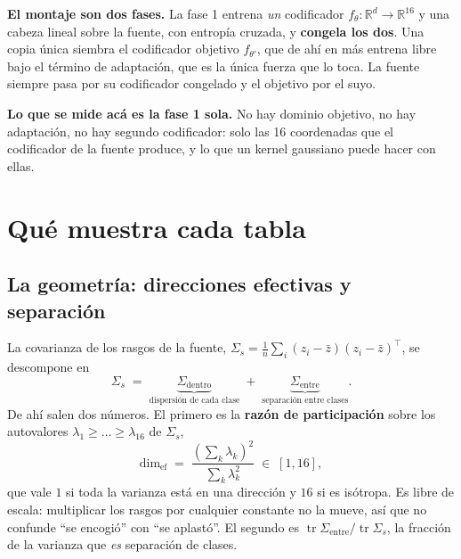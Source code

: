 \documentclass[11pt,a4paper]{article}
\begin{document}
\textbf{El montaje son dos fases.} La fase 1 entrena \emph{un} codificador
$f_\theta: \mathbb{R}^d \to \mathbb{R}^{16}$ y una cabeza lineal sobre la fuente,
con entropía cruzada, y \textbf{congela los dos}. Una copia única siembra el
codificador objetivo $f_{\theta'}$, que de ahí en más entrena libre bajo el término
de adaptación, que es la única fuerza que lo toca. La fuente siempre pasa por su
codificador congelado y el objetivo por el suyo.

\textbf{Lo que se mide acá es la fase 1 sola.} No hay dominio objetivo, no hay
adaptación, no hay segundo codificador: solo las 16 coordenadas que el codificador
de la fuente produce, y lo que un kernel gaussiano puede hacer con ellas.

\section{Qué muestra cada tabla}

\subsection{La geometría: direcciones efectivas y separación}

La covarianza de los rasgos de la fuente, $\Sigma_s = \tfrac{1}{n}\sum_i (z_i -
\bar z)(z_i - \bar z)^\top$, se descompone en
\[
\Sigma_s \;=\; \underbrace{\Sigma_{\text{dentro}}}_{\text{dispersión de cada clase}}
\;+\; \underbrace{\Sigma_{\text{entre}}}_{\text{separación entre clases}} .
\]
De ahí salen dos números. El primero es la \textbf{razón de participación} sobre
los autovalores $\lambda_1 \ge \dots \ge \lambda_{16}$ de $\Sigma_s$,
\[
  \mathrm{dim}_{\mathrm{ef}} \;=\; \frac{\left(\sum_k \lambda_k\right)^2}{\sum_k \lambda_k^2}
  \;\in\; [1, 16],
\]
que vale $1$ si toda la varianza está en una dirección y $16$ si es isótropa. Es
libre de escala: multiplicar los rasgos por cualquier constante no la mueve, así
que no confunde ``se encogió'' con ``se aplastó''. El segundo es
$\operatorname{tr}\Sigma_{\text{entre}} / \operatorname{tr}\Sigma_s$, la fracción
de la varianza que \emph{es} separación de clases.
\end{document}
